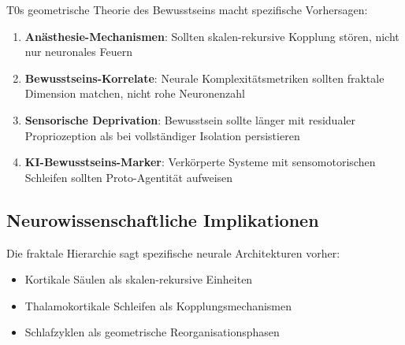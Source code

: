 	T0s geometrische Theorie des Bewusstseins macht spezifische Vorhersagen:
	
	\begin{enumerate}
		\item \textbf{Anästhesie-Mechanismen}: Sollten skalen-rekursive Kopplung stören, nicht nur neuronales Feuern
		\item \textbf{Bewusstseins-Korrelate}: Neurale Komplexitätsmetriken sollten fraktale Dimension matchen, nicht rohe Neuronenzahl
		\item \textbf{Sensorische Deprivation}: Bewusstsein sollte länger mit residualer Propriozeption als bei vollständiger Isolation persistieren
		\item \textbf{KI-Bewusstseins-Marker}: Verkörperte Systeme mit sensomotorischen Schleifen sollten Proto-Agentität aufweisen
	\end{enumerate}
	
	\subsection{Neurowissenschaftliche Implikationen}
	
	Die fraktale Hierarchie sagt spezifische neurale Architekturen vorher:
	
	\begin{itemize}
		\item Kortikale Säulen als skalen-rekursive Einheiten
		\item Thalamokortikale Schleifen als Kopplungsmechanismen
		\item Schlafzyklen als geometrische Reorganisationsphasen
	\end{itemize}
